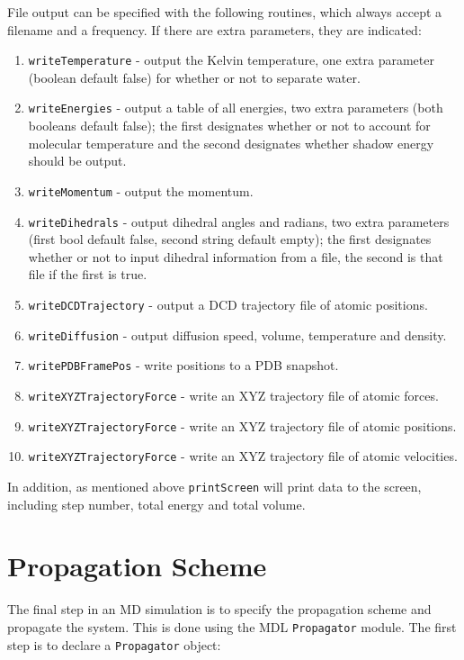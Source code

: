 \documentclass[11pt]{report}
\begin{document}
File output can be specified with the following routines,
which always accept a filename and a frequency.  If there are extra
parameters, they are indicated:

\begin{enumerate}
\item \texttt{writeTemperature} - output the Kelvin temperature, one extra parameter (boolean default false) for whether or not to separate water.
\item \texttt{writeEnergies} - output a table of all energies, two extra parameters (both booleans default false); the first designates whether or not to account for molecular temperature and the second designates whether shadow energy should be output.
\item \texttt{writeMomentum} - output the momentum.
\item \texttt{writeDihedrals} - output dihedral angles and radians, two extra parameters (first bool default false, second string default empty); the first designates whether or not to input dihedral information from a file, the second is that file if the first is true.
\item \texttt{writeDCDTrajectory} - output a DCD trajectory file of atomic positions.
\item \texttt{writeDiffusion} - output diffusion speed, volume, temperature and density.
\item \texttt{writePDBFramePos} - write positions to a PDB snapshot.
\item \texttt{writeXYZTrajectoryForce} - write an XYZ trajectory file of atomic forces.
\item \texttt{writeXYZTrajectoryForce} - write an XYZ trajectory file of atomic positions.
\item \texttt{writeXYZTrajectoryForce} - write an XYZ trajectory file of atomic velocities.
\end{enumerate}

In addition, as mentioned above \texttt{printScreen} will print data to the screen, including step number, total energy and total volume.


\section{Propagation Scheme}

The final step in an MD simulation is to specify the propagation
scheme and propagate the system.  This is done using the MDL \texttt{Propagator}
module.  The first step is to declare a \texttt{Propagator} object:
\end{document}
